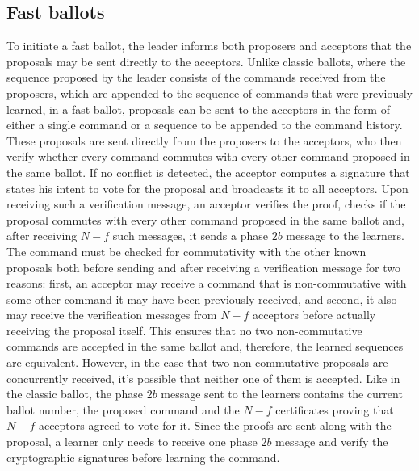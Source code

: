 

\subsection{Fast ballots} 

To initiate a fast ballot, the leader informs both proposers and acceptors that the proposals may be sent directly to the acceptors.  Unlike classic ballots, where the sequence proposed by the leader consists of the commands received from the proposers, which are appended to the sequence of commands that were previously learned, in a fast ballot, proposals can be sent to the acceptors in the form of either a single command or a sequence to be appended to the command history. These proposals are sent directly from the proposers to the acceptors, who then verify whether every command commutes with every other command proposed in the same ballot. If no conflict is detected, the acceptor computes a signature that states his intent to vote for the proposal and broadcasts it to all acceptors.   Upon receiving such a verification message, an acceptor verifies the proof, checks if the proposal commutes with every other command proposed in the same ballot and, after receiving $N-f$ such messages, it sends a phase $2b$ message to the learners. The command must be checked for commutativity with the other known proposals both before sending and after receiving a verification message for two reasons: first, an acceptor may receive a command that is non-commutative with some other command it may have been previously received, and second, it also may receive the verification messages from $N-f$ acceptors before actually receiving the proposal itself. This ensures that no two non-commutative commands are accepted in the same ballot and, therefore, the learned sequences are equivalent. However, in the case that two non-commutative proposals are concurrently received, it's possible that neither one of them is accepted. Like in the classic ballot, the phase $2b$ message sent to the learners contains the current ballot number, the proposed command and the $N-f$ certificates proving that $N-f$ acceptors agreed to vote for it. Since the proofs are sent along with the proposal, a learner only needs to receive one phase $2b$ message and verify the cryptographic signatures before learning the command.


